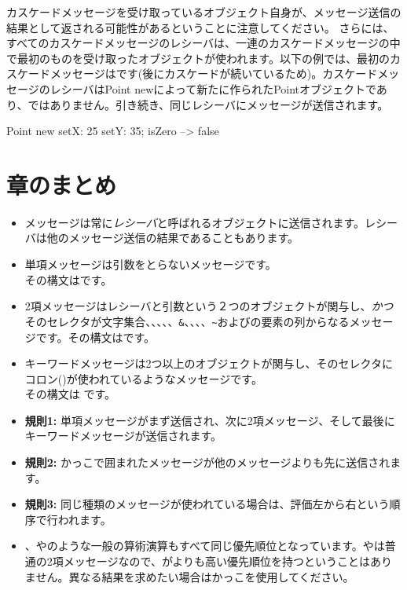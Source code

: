\documentclass[a4paper,10pt,twoside]{book}
\begin{document}
カスケードメッセージを受け取っているオブジェクト自身が、メッセージ送信の結果として返される可能性があるということに注意してください。
さらには、すべてのカスケードメッセージのレシーバは、一連のカスケードメッセージの中で最初のものを受け取ったオブジェクトが使われます。以下の例では、最初のカスケードメッセージはです(後にカスケードが続いているため)。カスケードメッセージのレシーバは{\ct Point new}によって新たに作られたPointオブジェクトであり、ではありません。引き続き、同じレシーバにメッセージが送信されます。

\begin{code}{}
Point new setX: 25 setY: 35; isZero --> false
\end{code}

\section{章のまとめ}

\begin{itemize}
\item メッセージは常に\emph{レシーバ}と呼ばれるオブジェクトに送信されます。レシーバは他のメッセージ送信の結果であることもあります。

\item 単項メッセージは引数をとらないメッセージです。\\
その構文はです。

\item 2項メッセージはレシーバと引数という２つのオブジェクトが関与し、\emph{かつ}そのセレクタが文字集合\ct{+}、\ct{-}、\ct{*}、\ct{/}、\ct{|}、\texttt{\&}、\ct{=}、\ct{>}、\ct{<}、\texttt{\~}およびの要素の列からなるメッセージです。その構文はです。

\item キーワードメッセージは2つ以上のオブジェクトが関与し、そのセレクタにコロン(\ct{:})が使われているようなメッセージです。\\
その構文は
です。

\item \textbf{規則1:} 単項メッセージがまず送信され、次に2項メッセージ、そして最後にキーワードメッセージが送信されます。
\item \textbf{規則2:} かっこで囲まれたメッセージが他のメッセージよりも先に送信されます。
\item \textbf{規則3:} 同じ種類のメッセージが使われている場合は、評価左から右という順序で行われます。
\item {}、\ct{+}や\ct{*}のような一般の算術演算もすべて同じ優先順位となっています。\ct{+}や\ct{*}は普通の2項メッセージなので、\ct{*}が\ct{+}よりも高い優先順位を持つということはありません。異なる結果を求めたい場合はかっこを使用してください。
\end{itemize}

\ifx\wholebook\relax\else
\end{document}
